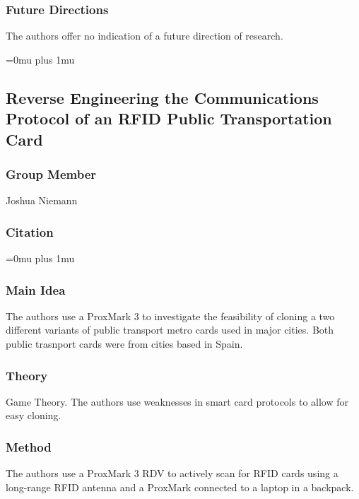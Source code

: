 \subsubsection{Future Directions}

\noindent
The authors offer no indication of a future direction of research. 

\Urlmuskip=0mu plus 1mu\relax

\noindent
\subsection{{R}everse {E}ngineering the {C}ommunications {P}rotocol of an {RFID} {P}ublic {T}ransportation {C}ard}

\subsubsection{Group Member}

\noindent
Joshua Niemann

\noindent
\subsubsection{Citation}

\Urlmuskip=0mu plus 1mu\relax

\subsubsection{Main Idea}

\noindent
The authors use a ProxMark 3 to investigate the feasibility of cloning a two different variants of public transport metro cards used in major cities.  Both public trasnport cards were from cities based in Spain.

\subsubsection{Theory}

\noindent
Game Theory.  The authors use weaknesses in smart card protocols to allow for easy cloning.

\subsubsection{Method}

\noindent
The authors use a ProxMark 3 RDV to actively scan for RFID cards using a long-range RFID antenna and a ProxMark connected to a laptop in a backpack.

